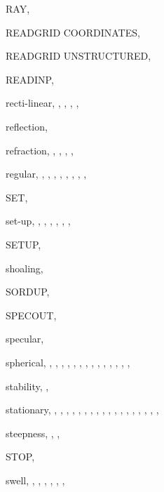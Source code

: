 \documentclass[12pt]{book}
\begin{document}
\begin{theindex}
  \indexspace

  \item RAY, 
  \item READGRID COORDINATES, 
  \item READGRID UNSTRUCTURED, 
  \item READINP, 
  \item recti-linear, , , , 
		, 
  \item reflection, 
  \item refraction, , , , 
		, 
  \item regular, , , , 
		, , , 
		, , 

  \indexspace

  \item SET, 
  \item set-up, , , , 
		, , , 
  \item SETUP, 
  \item shoaling, 
  \item SORDUP, 
  \item SPECOUT, 
  \item specular, 
  \item spherical, , , , 
		, , , 
		, , , 
		, , , 
		, , 
  \item stability, , 
  \item stationary, , , , 
		, , , 
		, , , 
		, , , 
		, , , 
		, , , 
  \item steepness, , , 
  \item STOP, 
  \item swell, , , , 
		, , , 


\end{theindex}
\end{document}
